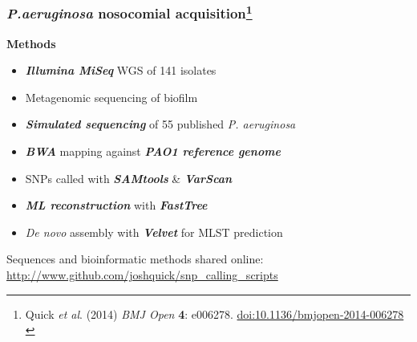 \begin{frame}
  \frametitle{\textit{P.aeruginosa} nosocomial acquisition\footnote{\tiny{Quick \textit{et al}. (2014) \textit{BMJ Open} \textbf{4}: e006278. \href{http://dx.doi.org/10.1136/bmjopen-2014-006278}{doi:10.1136/bmjopen-2014-006278}}\\}}
  \textbf{Methods} \\
  \begin{itemize}
    \item \textbf{\textit{Illumina MiSeq}} WGS of 141 isolates \\
    \item Metagenomic sequencing of biofilm \\    
    \item \textbf{\textit{Simulated sequencing}} of 55 published \textit{P. aeruginosa} \\
    \item \textbf{\textit{BWA}} mapping against \textbf{\textit{PAO1 reference genome}} \\
    \item SNPs called with \textbf{\textit{SAMtools}} \& \textbf{\textit{VarScan}} \\
    \item \textbf{\textit{ML reconstruction}} with \textbf{\textit{FastTree}} \\
    \item \textit{De novo} assembly with \textbf{\textit{Velvet}} for MLST prediction \\
  \end{itemize}
  Sequences and bioinformatic methods shared online: \href{http://www.github.com/joshquick/snp_calling_scripts}{http://www.github.com/joshquick/snp\_calling\_scripts} \\
\end{frame}

